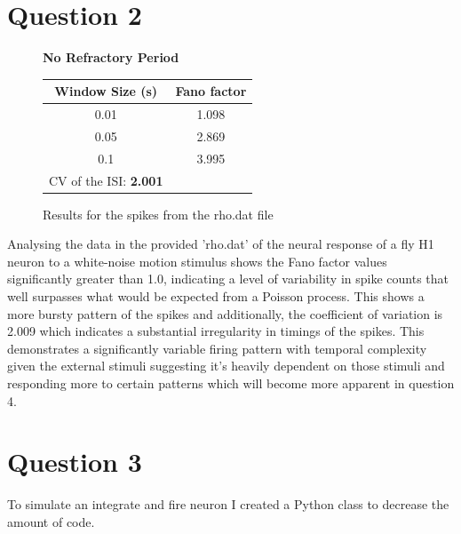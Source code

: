 \documentclass[11pt]{article}
\begin{document}
\newpage
\section*{Question 2} \label{question 2}

\begin{figure}
    \centering
    \begin{minipage}[t]{0.5\textwidth}
        \vspace{1mm}
        \centering
        \textbf{No Refractory Period}
        \begin{tabular}{cc}
        \toprule
        Window Size (s) & Fano factor \\
        \midrule
        0.01 & 1.098 \\
        0.05 & 2.869 \\
        0.1  & 3.995 \\
        \bottomrule
        CV of the ISI: \textbf{2.001}
        \end{tabular}
        \vspace{1mm}
    \end{minipage}
    \caption{Results for the spikes from the rho.dat file}
    \label{fig:results1}
\end{figure}
Analysing the data in the provided 'rho.dat' of the neural response of a fly H1 neuron to a white-noise motion stimulus shows the Fano factor values significantly greater than 1.0, indicating a level of variability in spike counts that well surpasses what would be expected from a Poisson process. This shows a more bursty pattern of the spikes and additionally, the coefficient of variation is 2.009 which indicates a substantial irregularity in timings of the spikes. This demonstrates a significantly variable firing pattern with temporal complexity given the external stimuli suggesting it's heavily dependent on those stimuli and responding more to certain patterns which will become more apparent in question 4.

\section*{Question 3} \label{question 3}

To simulate an integrate and fire neuron I created a Python class to decrease the amount of code.
\end{document}
